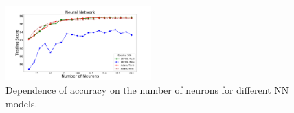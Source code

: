 \begin{figure}[h]
\hspace*{-0.5cm}
\includegraphics[width=0.5\textwidth]{plots/nn_neurons_300epochs.pdf}
\caption{Dependence of accuracy on the number of neurons for different NN models.}
\label{fig:NN_neurons}
\end{figure}

